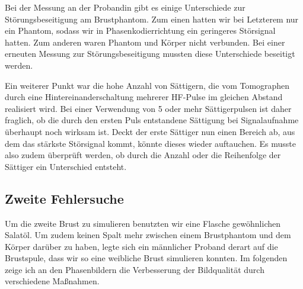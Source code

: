 \documentclass[
    11pt,
    ngerman
]{scrreprt}
\begin{document}
Bei der Messung an der Probandin gibt es einige Unterschiede zur
Störungsbeseitigung am Brustphantom. Zum einen hatten wir bei Letzterem nur
ein Phantom, sodass wir in Phasenkodierrichtung ein geringeres Störsignal
hatten. Zum anderen waren Phantom und Körper nicht verbunden.
Bei einer erneuten Messung zur Störungsbeseitigung mussten
diese Unterschiede beseitigt werden. 

Ein weiterer Punkt war die hohe Anzahl von Sättigern, die vom Tomographen
durch eine Hintereinanderschaltung mehrerer HF-Pulse im gleichen Abstand
realisiert wird. Bei einer Verwendung von 5 oder mehr Sättigerpulsen ist daher
fraglich, ob die durch den ersten Puls entstandene Sättigung bei
Signalaufnahme überhaupt noch wirksam ist. Deckt der erste Sättiger nun einen
Bereich ab, aus dem das stärkste Störsignal kommt, könnte dieses wieder
auftauchen. Es musste also zudem überprüft werden, ob durch die Anzahl oder die
Reihenfolge der Sättiger ein Unterschied entsteht.

\subsection{Zweite Fehlersuche}

Um die zweite Brust zu simulieren benutzten wir eine Flasche gewöhnlichen
Salatöl. Um zudem keinen Spalt mehr zwischen einem Brustphantom und dem Körper
darüber zu haben, legte sich ein männlicher Proband derart auf die Brustspule,
dass wir so eine weibliche Brust simulieren konnten. Im folgenden zeige ich an
den Phasenbildern die Verbesserung der Bildqualität durch verschiedene
Maßnahmen.
\end{document}
